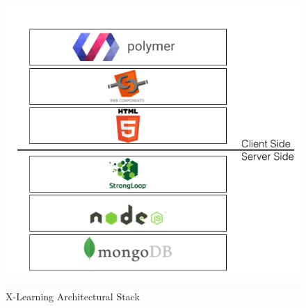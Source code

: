 \begin{figure}[htb] %
 \centering
 \includegraphics[width=1.0\linewidth]{images/chapter4/XPR_stack.png}\hfill
 \caption[X-learning Architectural Stack]{X-Learning Architectural Stack}
 \label{fig:fourV}
\end{figure}